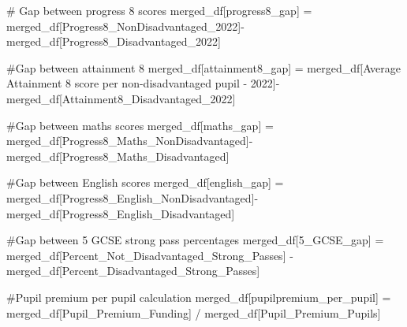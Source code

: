 \documentclass[
  letterpaper,
  DIV=11,
  numbers=noendperiod]{scrartcl}
\newenvironment{Shaded}{\begin{snugshade}}{\end{snugshade}}
\newcommand{\CommentTok}[1]{\textcolor[rgb]{0.37,0.37,0.37}{#1}}
\newcommand{\NormalTok}[1]{\textcolor[rgb]{0.00,0.23,0.31}{#1}}
\newcommand{\OperatorTok}[1]{\textcolor[rgb]{0.37,0.37,0.37}{#1}}
\newcommand{\StringTok}[1]{\textcolor[rgb]{0.13,0.47,0.30}{#1}}
\begin{document}
\begin{Shaded}
\begin{Highlighting}[]
\CommentTok{\# Gap between progress 8 scores}
\NormalTok{merged\_df[}\StringTok{\textquotesingle{}progress8\_gap\textquotesingle{}}\NormalTok{] }\OperatorTok{=}\NormalTok{ merged\_df[}\StringTok{\textquotesingle{}Progress8\_NonDisadvantaged\_2022\textquotesingle{}}\NormalTok{]}\OperatorTok{{-}}\NormalTok{merged\_df[}\StringTok{\textquotesingle{}Progress8\_Disadvantaged\_2022\textquotesingle{}}\NormalTok{]}

\CommentTok{\#Gap between attainment 8}
\NormalTok{merged\_df[}\StringTok{\textquotesingle{}attainment8\_gap\textquotesingle{}}\NormalTok{] }\OperatorTok{=}\NormalTok{ merged\_df[}\StringTok{\textquotesingle{}Average Attainment 8 score per non{-}disadvantaged pupil  {-} 2022\textquotesingle{}}\NormalTok{]}\OperatorTok{{-}}\NormalTok{merged\_df[}\StringTok{\textquotesingle{}Attainment8\_Disadvantaged\_2022\textquotesingle{}}\NormalTok{]}


\CommentTok{\#Gap between maths scores}
\NormalTok{merged\_df[}\StringTok{\textquotesingle{}maths\_gap\textquotesingle{}}\NormalTok{] }\OperatorTok{=}\NormalTok{ merged\_df[}\StringTok{\textquotesingle{}Progress8\_Maths\_NonDisadvantaged\textquotesingle{}}\NormalTok{]}\OperatorTok{{-}}\NormalTok{ merged\_df[}\StringTok{\textquotesingle{}Progress8\_Maths\_Disadvantaged\textquotesingle{}}\NormalTok{]}

\CommentTok{\#Gap between English scores}
\NormalTok{merged\_df[}\StringTok{\textquotesingle{}english\_gap\textquotesingle{}}\NormalTok{] }\OperatorTok{=}\NormalTok{ merged\_df[}\StringTok{\textquotesingle{}Progress8\_English\_NonDisadvantaged\textquotesingle{}}\NormalTok{]}\OperatorTok{{-}}\NormalTok{ merged\_df[}\StringTok{\textquotesingle{}Progress8\_English\_Disadvantaged\textquotesingle{}}\NormalTok{]}

\CommentTok{\#Gap between 5 GCSE strong pass percentages}
\NormalTok{merged\_df[}\StringTok{\textquotesingle{}5\_GCSE\_gap\textquotesingle{}}\NormalTok{] }\OperatorTok{=}\NormalTok{ merged\_df[}\StringTok{\textquotesingle{}Percent\_Not\_Disadvantaged\_Strong\_Passes\textquotesingle{}}\NormalTok{] }\OperatorTok{{-}}\NormalTok{ merged\_df[}\StringTok{\textquotesingle{}Percent\_Disadvantaged\_Strong\_Passes\textquotesingle{}}\NormalTok{]}

\CommentTok{\#Pupil premium per pupil calculation }
\NormalTok{merged\_df[}\StringTok{\textquotesingle{}pupilpremium\_per\_pupil\textquotesingle{}}\NormalTok{] }\OperatorTok{=}\NormalTok{ merged\_df[}\StringTok{\textquotesingle{}Pupil\_Premium\_Funding\textquotesingle{}}\NormalTok{] }\OperatorTok{/}\NormalTok{ merged\_df[}\StringTok{\textquotesingle{}Pupil\_Premium\_Pupils\textquotesingle{}}\NormalTok{]}
\end{Highlighting}
\end{Shaded}
\end{document}
